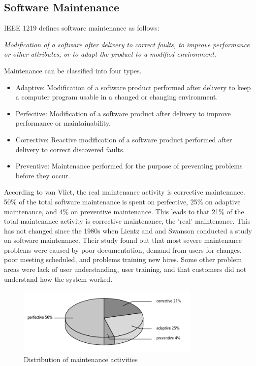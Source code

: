 \subsection{Software Maintenance}
IEEE 1219 defines software maintenance as follows\cite{720567}:
\begin{displayquote}
\textit{Modification of a software after delivery to correct faults, to improve performance or other attributes, or to adapt the product to a modified environment.}
\end{displayquote} 
Maintenance can be classified into four types\cite{Bennett:2000:SME:336512.336534,720567}.

\begin{itemize}
	\item Adaptive: Modification of a software product performed after delivery to keep a computer program usable in a changed or changing environment.
	\item Perfective: Modification of a software product after delivery to improve performance or maintainability.
	\item Corrective: Reactive modification of a software product performed after delivery to correct discovered faults.
	\item Preventive: Maintenance performed for the purpose of preventing problems before they occur.
\end{itemize}

According to van Vliet, the real maintenance activity is corrective maintenance\cite{Vliet:2008:SEP:1481475}. 50\% of the total software maintenance is spent on perfective, 25\% on adaptive maintenance, and 4\% on preventive maintenance. This leads to that 21\% of the total maintenance activity is corrective maintenance, the 'real' maintenance\cite{Vliet:2008:SEP:1481475}. This has not changed since the 1980s when Lientz and and Swanson conducted a study on software maintenance\cite{lientz1980software}. Their study found out that most severe maintenance problems were caused by poor documentation, demand from users for changes, poor meeting scheduled, and problems training new hires. Some other problem areas were lack of user understanding, user training, and that customers did not understand how the system worked.

\begin{figure}
	\centering
	\includegraphics[width=0.8\textwidth]{images/maintenance.png}
	\caption{Distribution of maintenance activities\cite{Vliet:2008:SEP:1481475}}
	\label{fig:maintenanceActivities}
\end{figure}



